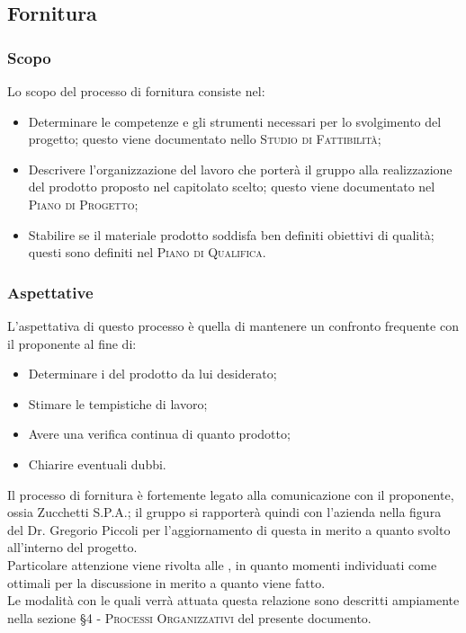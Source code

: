 \documentclass[../norme-di-progetto.tex]{subfiles}
\begin{document}

\subsection{Fornitura}
\subsubsection{Scopo}
Lo scopo del processo di fornitura consiste nel:
\begin{itemize}
  \item Determinare le competenze e gli strumenti necessari per lo svolgimento del progetto; questo viene documentato nello \textsc{Studio di Fattibilità};
  \item Descrivere l'organizzazione del lavoro che porterà il gruppo alla realizzazione del prodotto proposto nel capitolato scelto; questo viene documentato nel \textsc{Piano di Progetto};
  \item Stabilire se il materiale prodotto soddisfa ben definiti obiettivi di qualità; questi sono definiti nel \textsc{Piano di Qualifica}.
\end{itemize}

\subsubsection{Aspettative}
L'aspettativa di questo processo è quella di mantenere un confronto frequente con il proponente al fine di:
\begin{itemize}
  \item Determinare i  del prodotto da lui desiderato;
  \item Stimare le tempistiche di lavoro;
  \item Avere una verifica continua di quanto prodotto;
  \item Chiarire eventuali dubbi.
\end{itemize}
Il processo di fornitura è fortemente legato alla comunicazione con il proponente, ossia Zucchetti S.P.A.; il gruppo si rapporterà quindi con l'azienda nella figura del Dr. Gregorio Piccoli per l'aggiornamento di questa in merito a quanto svolto all'interno del progetto. \\
Particolare attenzione viene rivolta alle , in quanto momenti individuati come ottimali per la discussione in merito a quanto viene fatto. \\
Le modalità con le quali verrà attuata questa relazione sono descritti ampiamente nella sezione \textsc{\S 4 - Processi Organizzativi} del presente documento.
\end{document}
